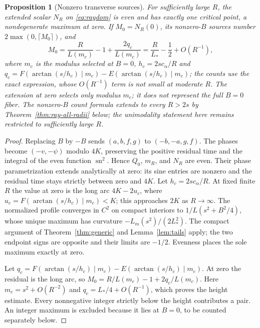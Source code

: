 \documentclass[11pt,a4paper]{article}
\newtheorem{proposition}[theorem]{Proposition}
\theoremstyle{remark}\newtheorem{remark}[theorem]{Remark}
\newcommand{\sn}{\operatorname{sn}}
\begin{document}
\begin{proposition}[Nonzero transverse sources]\label{prop:offseam}
For sufficiently large $R$, the extended scalar $N_R$ on
\eqref{eq:raydom} is even and has exactly one critical point, a
nondegenerate maximum at zero. If $M_0=N_R(0)$, its nonzero-$B$ sources
number $2\max(0,\lceil M_0\rceil)$, and
\[
 M_0=\frac{R}{L(m_c)}-1+\frac{2q_c}{L(m_c)}=\frac R{L_*}-\frac12+O(R^{-1}),
\]
where $m_c$ is the modulus selected at $B=0$, $h_c=2sc_\alpha/R$ and
$q_c=F(\arctan(s/h_c)\mid m_c)-E(\arctan(s/h_c)\mid m_c)$; the counts use
the exact expression, whose $O(R^{-1})$ term is not small at moderate
$R$.  The extension at zero selects only modulus $m_c$; it does not
represent the full $B=0$ fiber. The nonzero-$B$ count formula extends to every
$R>2s$ by Theorem~\ref{thm:ray-all-radii} below; the unimodality
statement here remains restricted to sufficiently large $R$.
\end{proposition}
\begin{proof}
Replacing $B$ by $-B$ sends $(a,b,f,g)$ to $(-b,-a,g,f)$.
The phases become $(-v,-\psi)$ modulo $4K$, preserving the positive
residual time and the integral of the even function $\sn^2$.
Hence $Q_0$, $m_R$, and $N_R$ are even. Their phase parametrization
extends analytically at zero: its sine entries are nonzero and the
residual time stays strictly between zero and $4K$. Let
$h_c=2sc_\alpha/R$. At fixed finite $R$ the value at zero is the long
arc $4K-2u_c$, where $u_c=F(\arctan(s/h_c)\mid m_c)<K$;
this approaches $2K$ as $R\to\infty$.
The normalized profile converges in $C^2$ on compact interiors to
$1/L(s^2+B^2/4)$, whose unique maximum has curvature
$-L_m(s^2)/(2L_*^2)$. The compact argument of
Theorem~\ref{thm:generic} and Lemma~\ref{lem:tails} apply; the two
endpoint signs are opposite and their limits are $-1/2$.
Evenness places the sole maximum exactly at zero.

Let
$q_c=F(\arctan(s/h_c)\mid m_c)-E(\arctan(s/h_c)\mid m_c)$.
At zero the residual is the long arc, so
$M_0=R/L(m_c)-1+2q_c/L(m_c)$.
Here $m_c=s^2+O(R^{-2})$ and $q_c=L_*/4+O(R^{-1})$,
which proves the height estimate. Every nonnegative integer strictly
below the height contributes a pair. An integer maximum is excluded
because it lies at $B=0$, to be counted separately below.
\end{proof}
\end{document}
